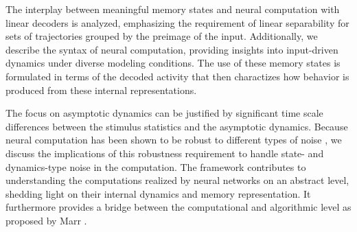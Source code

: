 \documentclass[12pt,letterpaper, onecolumn]{article}
\theoremstyle{definition}
\theoremstyle{remark}
\begin{document}
 The interplay between meaningful memory states and neural computation with linear decoders is analyzed, emphasizing the requirement of linear separability for sets of trajectories grouped by the preimage of the input. 
Additionally, we describe the syntax of neural computation, providing insights into input-driven dynamics under diverse modeling conditions.
The use of these memory states is formulated in terms of the decoded activity that then charactizes how behavior is produced from these internal representations. 


The focus on asymptotic dynamics can be justified by significant time scale differences between the stimulus statistics and the asymptotic dynamics.
Because neural computation has been shown to be robust to different types of noise \cite{Park2023a}, we discuss the implications of this robustness requirement to handle state- and dynamics-type noise in the computation. 
The framework contributes to understanding the computations realized by neural networks on an abstract level, shedding light on their internal dynamics and memory representation.
It furthermore provides a bridge between the computational and algorithmic level as proposed by Marr \cite{marr2010}.







\printbibliography
\end{document}
